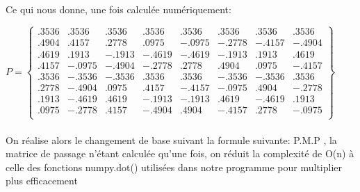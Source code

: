 \documentclass[12pt]{article}
\begin{document}
\paragraph{}
Ce qui nous donne, une fois calculée numériquement:
\begin{center}

$P=
\begin{Bmatrix}

.3536& .3536& .3536& .3536& .3536& .3536& .3536& .3536 \\
.4904& .4157& .2778& .0975& -.0975& -.2778& -.4157& -.4904 \\
.4619& .1913& -.1913& -.4619& -.4619& -.1913& .1913& .4619 \\
.4157& -.0975& -.4904& -.2778 & .2778& .4904& .0975& -.4157 \\
.3536& -.3536& -.3536& .3536& .3536& -.3536& -.3536& .3536 \\
.2778& -.4904& .0975& .4157& -.4157& -.0975& .4904& -.2778 \\
.1913& -.4619& .4619& -.1913& -.1913& .4619& -.4619& .1913 \\
.0975& -.2778& .4157& -.4904& .4904& -.4157& .2778& -.0975 \\

\end{Bmatrix}
$
\end{center}

\paragraph{}
On réalise alors le changement de base suivant la formule suivante: P.M.P , la matrice de passage n'étant calculée qu'une fois, on réduit la complexité de O(n) à celle des fonctions numpy.dot() utilisées dans notre programme pour multiplier plus efficacement 
\newline
\end{document}
